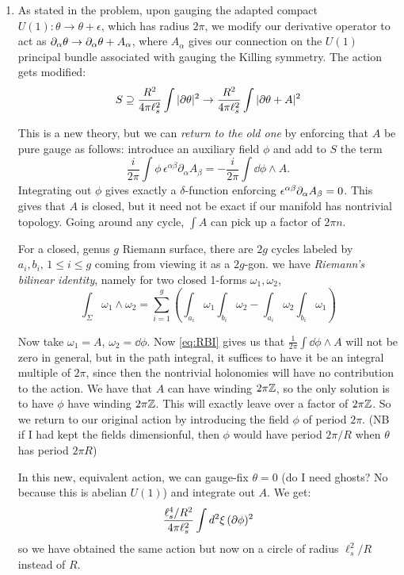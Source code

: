 \documentclass[11pt, class=article, crop=false]{standalone}
\begin{document}
\begin{enumerate}
	\item As stated in the problem, upon gauging the adapted compact $U(1): \theta \to \theta + \epsilon$, which has radius $2\pi$, we modify our derivative operator to act as $\partial_\alpha \theta \to \partial_\alpha \theta + A_\alpha$, where $A_\alpha$ gives our connection on the $U(1)$ principal bundle associated with gauging the Killing symmetry. The action gets modified:
	\[
		S \supseteq \frac{R^2}{4\pi \ell_s^2} \int |\partial \theta|^2 \to \frac{R^2}{4\pi \ell_s^2} \int |\partial \theta + A|^2
	\]
	
	This is a new theory, but we can \emph{return to the old one} by enforcing that $A$ be pure gauge as follows: introduce an auxiliary field $\phi$ and add to $S$ the term 
	\[
		\frac{i}{2\pi} \int \phi\, \epsilon^{\alpha \beta} \partial_{\alpha} A_{\beta} = - \frac{i}{2\pi} \int \dd \phi \wedge A.
	\]
	 Integrating out $\phi$ gives exactly a $\delta$-function enforcing $\epsilon^{\alpha \beta} \partial_\alpha A_{\beta}=0$. This gives that $A$ is closed, but it need not be exact if our manifold has nontrivial topology. Going around any cycle, $\int A$ can pick up a factor of $2 \pi n$. 
	
	For a closed, genus $g$ Riemann surface, there are $2g$ cycles labeled by $a_i, b_i, \, 1\leq i \leq g$ coming from viewing it as a $2g$-gon. we have \emph{Riemann's bilinear identity}, namely for two closed 1-forms $\omega_1, \omega_2$, 
	\begin{equation}\label{eq:RBI}
			\int_\Sigma \omega_1 \wedge \omega_2 = \sum_{i=1}^g \left(\int_{a_i} \omega_1 \int_{b_i} \omega_2 - \int_{a_i} \omega_2 \int_{b_i} \omega_1 \right)	
	\end{equation}

	Now take $\omega_1 = A$, $\omega_2 = \dd \phi$. Now \eqref{eq:RBI} gives us that $\frac{1}{2\pi} \int \dd \phi \wedge A$ will not be zero in general, but in the path integral, it suffices to have it be an integral multiple of $2 \pi$, since then the nontrivial holonomies will have no contribution to the action. We have that $A$ can have winding $2 \pi \mathbb{Z}$, so the only solution is to have $\phi$ have winding $2 \pi \mathbb{Z}$. This will exactly leave over a factor of $2 \pi \mathbb{Z}$. So we return to our original action by introducing the field $\phi$ of period $2\pi$. (NB if I had kept the fields dimensionful, then $\phi$ would have period $2 \pi /R$ when $\theta$ has period $2 \pi R$)
	
	In this new, equivalent action, we can gauge-fix $\theta=0$ (do I need ghosts? No because this is abelian $U(1)$) and integrate out $A$. We get:
	\[
		\frac{\ell_s^4 / R^2}{4\pi \ell_s^2} \int d^2 \xi \, (\partial \phi)^2 
	\]
	so we have obtained the same action but now on a circle of radius $\ell_s^2/R$ instead of $R$. 
	

\end{enumerate}
\end{document}
